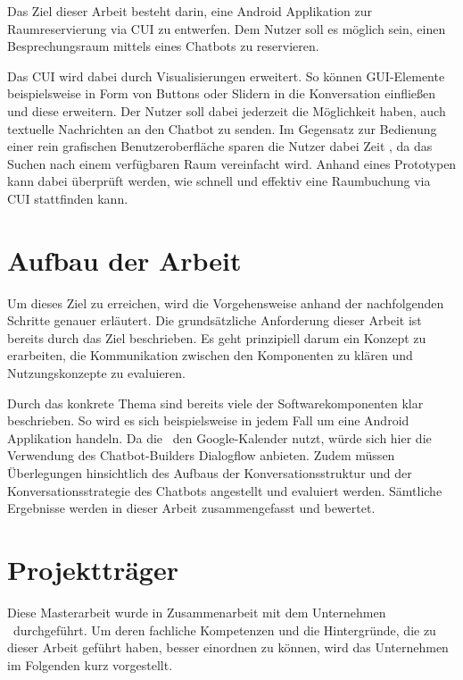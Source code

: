 Das Ziel dieser Arbeit besteht darin, eine Android Applikation zur Raumreservierung via \acl{CUI} zu entwerfen. Dem Nutzer soll es möglich sein, einen Besprechungsraum mittels eines Chatbots zu reservieren. 

Das \ac{CUI} wird dabei durch Visualisierungen erweitert. So können \ac{GUI}-Elemente beispielsweise in Form von Buttons oder Slidern in die Konversation einfließen und diese erweitern. Der Nutzer soll dabei jederzeit die Möglichkeit haben, auch textuelle Nachrichten an den Chatbot zu senden. Im Gegensatz zur Bedienung einer rein grafischen Benutzeroberfläche sparen die Nutzer dabei Zeit \cite{weddehage_10_2016}, da das Suchen nach einem verfügbaren Raum vereinfacht wird. Anhand eines Prototypen kann dabei überprüft werden, wie schnell und effektiv eine Raumbuchung via \ac{CUI} stattfinden kann.

\section{Aufbau der Arbeit}
\label{sec:aufbau-der-arbeit}

Um dieses Ziel zu erreichen, wird die Vorgehensweise anhand der nachfolgenden Schritte genauer erläutert. Die grundsätzliche Anforderung dieser Arbeit ist bereits durch das Ziel beschrieben. Es geht prinzipiell darum ein Konzept zu erarbeiten, die Kommunikation zwischen den Komponenten zu klären und Nutzungskonzepte zu evaluieren. 

Durch das konkrete Thema sind bereits viele der Softwarekomponenten klar beschrieben. So wird es sich beispielsweise in jedem Fall um eine Android Applikation handeln. Da die \adorsys\ den Google-Kalender nutzt, würde sich hier die Verwendung des Chatbot-Builders Dialogflow anbieten. Zudem müssen Überlegungen hinsichtlich des Aufbaus der Konversationsstruktur und der Konversationsstrategie des Chatbots angestellt und evaluiert werden. Sämtliche Ergebnisse werden in dieser Arbeit zusammengefasst und bewertet.

\section{Projektträger}
\label{sec:projekttraeger}

Diese Masterarbeit wurde in Zusammenarbeit mit dem Unternehmen \adorsys\ durchgeführt. Um deren fachliche Kompetenzen und die Hintergründe, die zu dieser Arbeit geführt haben, besser einordnen zu können, wird das Unternehmen im Folgenden kurz vorgestellt.

